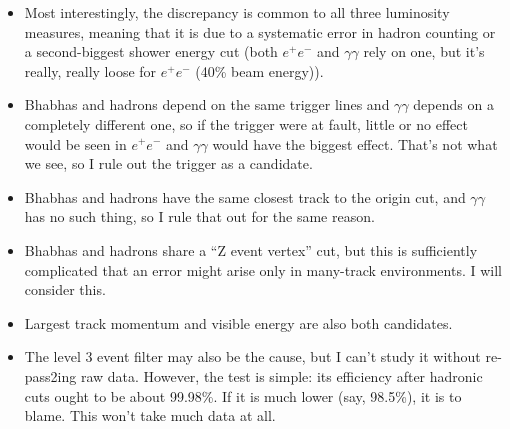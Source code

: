 \documentclass[12pt]{article}
\begin{document}
\begin{itemize}
\item Most interestingly, the discrepancy is common to all three
luminosity measures, meaning that it is due to a systematic error in
hadron counting or a second-biggest shower energy cut (both $e^+e^-$
and $\gamma\gamma$ rely on one, but it's really, really loose for
$e^+e^-$ (40\% beam energy)).

\item Bhabhas and hadrons depend on the same trigger lines and
$\gamma\gamma$ depends on a completely different one, so if the
trigger were at fault, little or no effect would be seen in $e^+e^-$
and $\gamma\gamma$ would have the biggest effect.  That's not what we
see, so I rule out the trigger as a candidate.

\item Bhabhas and hadrons have the same closest track to the origin
cut, and $\gamma\gamma$ has no such thing, so I rule that out for the
same reason.

\item Bhabhas and hadrons share a ``Z event vertex'' cut, but this is
sufficiently complicated that an error might arise only in many-track
environments.  I will consider this.

\item Largest track momentum and visible energy are also both
candidates.

\item The level 3 event filter may also be the cause, but I can't
study it without re-pass2ing raw data.  However, the test is simple:
its efficiency after hadronic cuts ought to be about 99.98\%.  If it
is much lower (say, 98.5\%), it is to blame.  This won't take much
data at all.

\end{itemize}
\end{document}
